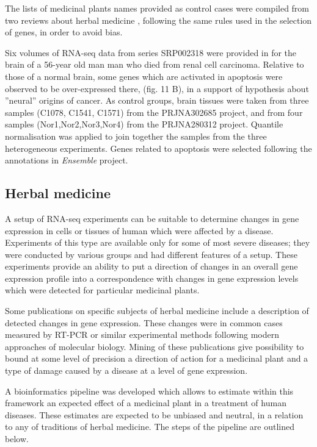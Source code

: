 \documentclass[12pt,aps]{revtex4}
\begin{document}
The lists of medicinal plants names provided as control cases were compiled from two reviews about herbal medicine \cite{CH1,CH2}, following the same rules used in the selection of genes, in order to avoid bias. 

Six volumes of RNA-seq data from series SRP002318 were provided in \cite{CO1} for the brain of a 56-year old man man who died from renal cell carcinoma. Relative to those of a normal brain, some genes which are activated in apoptosis were observed to be over-expressed there, (fig. 11 B), in a support of hypothesis about ''neural'' origins of cancer.  As control groups, brain tissues were taken from three samples (C1078, C1541, C1571) from the PRJNA302685 project, and from four samples (Nor1,Nor2,Nor3,Nor4) from the PRJNA280312 project. Quantile normalisation was applied to join together the samples from the three heterogeneous experiments. Genes related to apoptosis were selected following the annotations in \textit{Ensemble} project.

\subsection{Herbal medicine}

A setup of RNA-seq experiments can be suitable to determine changes in gene expression in cells or tissues of human which were affected by a disease. Experiments of this type are available only for some of most severe diseases; they were conducted by various groups and had different features of a setup. These experiments provide an ability to put a direction of changes in an overall gene expression profile into a correspondence with changes in gene expression levels which were detected for particular medicinal plants. 

Some publications on specific subjects of herbal medicine include a description of detected changes in gene expression. These changes were in common cases measured by RT-PCR or similar experimental methods following modern approaches of molecular biology. Mining of these publications give possibility to bound at some level of precision a direction of action for a medicinal plant and a type of damage caused by a disease at a level of gene expression.  

A bioinformatics pipeline was developed which allows to estimate within this framework an expected effect of a medicinal plant in a treatment of human diseases. These estimates are expected to be unbiased and neutral, in a relation to any of traditions of herbal medicine. The steps of the pipeline are outlined below.
\end{document}
